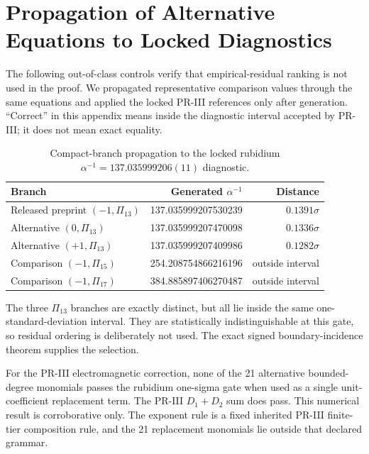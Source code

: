 \section{Propagation of Alternative Equations to Locked Diagnostics}
\label{app:alternative-propagation}

The following out-of-class controls verify that empirical-residual ranking is not used in the proof.  We propagated representative comparison values through the same equations and applied the locked PR-III references only after generation.  ``Correct'' in this appendix means inside the diagnostic interval accepted by PR-III; it does not mean exact equality.

\begin{table}[H]
\centering
\small
\caption{Compact-branch propagation to the locked rubidium
$\alpha^{-1}=137.035999206(11)$ diagnostic.}
\label{tab:compact-diagnostic-propagation}
\begin{tabular}{@{}lrr@{}}
\toprule
Branch & Generated $\alpha^{-1}$ & Distance \\
\midrule
Released preprint $(-1,\Pi_{13})$ & 137.035999207530239 & $0.1391\sigma$ \\
Alternative $(0,\Pi_{13})$ & 137.035999207470098 & $0.1336\sigma$ \\
Alternative $(+1,\Pi_{13})$ & 137.035999207409986 & $0.1282\sigma$ \\
Comparison $(-1,\Pi_{15})$ & 254.208754866216196 & outside interval \\
Comparison $(-1,\Pi_{17})$ & 384.885897406270487 & outside interval \\
\bottomrule
\end{tabular}
\end{table}

The three $\Pi_{13}$ branches are exactly distinct, but all lie inside the same one-standard-deviation interval.  They are statistically indistinguishable at this gate, so residual ordering is deliberately not used.  The exact signed boundary-incidence theorem supplies the selection.

For the PR-III electromagnetic correction, none of the 21 alternative bounded-degree monomials passes the rubidium one-sigma gate when used as a single unit-coefficient replacement term.  The PR-III $D_1+D_2$ sum does pass.  This numerical result is corroborative only.  The exponent rule is a fixed inherited PR-III finite-tier composition rule, and the 21 replacement monomials lie outside that declared grammar.

